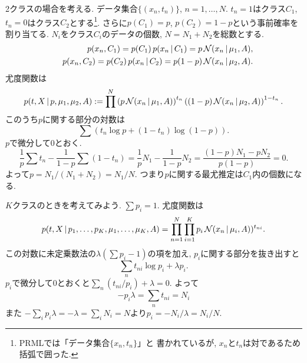 2クラスの場合を考える. 
データ集合$\{(x_n, t_n)\}$, $n=1, \ldots, N$. $t_n=1$はクラス$C_1$,
$t_n=0$はクラス$C_2$とする\footnote{PRMLでは「データ集合$\{x_n, t_n\}$」と
書かれているが, $x_n$と$t_n$は対であるため括弧で囲った.}.
さらに$p(C_1)=p$, $p(C_2)=1-p$という事前確率を割り当てる. $N_i$をクラス$C_i$のデータの個数, $N=N_1+N_2$を総数とする.
\begin{eqnarray*}
&& p(x_n, C_1)=p(C_1)\,p(x_n\,|\,C_1)=p \,{\cal N}(x_n\,|\,\mu_1, A),
\\
&& p(x_n, C_2)=p(C_2)\,p(x_n\,|\,C_2)=p (1-p) \,{\cal N}(x_n\,|\,\mu_2, A).
\end{eqnarray*}
尤度関数は
$$
p(t,X\,|\,p, \mu_1, \mu_2, A):= \prod^N\left(p \,{\cal N}(x_n\,|\,\mu_1, A)\right)^{t_n} \left((1-p)\,{\cal N}(x_n\,|\,\mu_2,A)\right)^{1-t_n}.
$$
このうち$p$に関する部分の対数は
$$
\sum \left(t_n \log p + (1-t_n) \log (1-p)\right).
$$
$p$で微分して$0$とおく.
$$
\frac{1}{p}\sum t_n - \frac{1}{1-p}\sum (1-t_n)=\frac{1}{p} N_1 - \frac{1}{1-p} N_2=\frac{(1-p)N_1-pN_2}{p(1-p)}=0.
$$
よって$p=N_1/(N_1+N_2)=N_1/N$.
つまり$p$に関する最尤推定は$C_1$内の個数になる.

$K$クラスのときを考えてみよう.
$\sum p_i=1$. 尤度関数は
$$
p(t,X\,|\,p_1, \ldots, p_K, \mu_1, \ldots, \mu_K, A)=\prod_{n=1}^N \prod_{i=1}^K p_i \,{\cal N}(x_n\,|\,\mu_i,A))^{t_{ni}}.
$$
この対数に未定乗数法の$\lambda (\sum p_i - 1)$の項を加え, $p_i$に関する部分を抜き出すと
$$
\sum_n t_{ni} \log p_i+\lambda p_i.
$$
$p_i$で微分して$0$とおくと$\sum_n (t_{ni}/p_i) + \lambda=0$.
よって
$$
-p_i \lambda = \sum_n t_{ni}=N_i
$$
また
$-\sum_i p_i \lambda = -\lambda = \sum_i N_i = N$より$p_i=-N_i/\lambda=N_i/N$.

